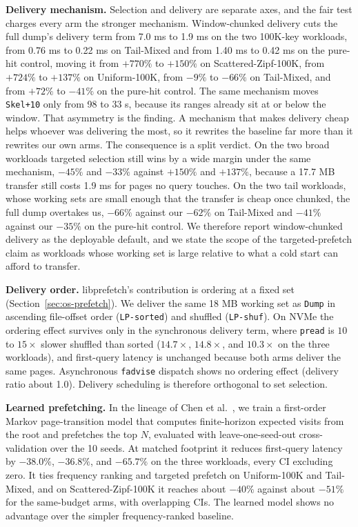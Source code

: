 \documentclass[sigconf, nonacm]{acmart}
\begin{document}
\textbf{Delivery mechanism.} Selection and delivery are separate axes, and the fair test
charges every arm the stronger mechanism. Window-chunked delivery cuts the full dump's delivery
term from 7.0 ms to 1.9 ms on the two 100K-key workloads, from 0.76 ms to 0.22 ms on Tail-Mixed
and from 1.40 ms to 0.42 ms on the pure-hit control, moving it from $+770\%$ to $+150\%$ on
Scattered-Zipf-100K, from $+724\%$ to $+137\%$ on Uniform-100K, from $-9\%$ to $-66\%$ on
Tail-Mixed, and from $+72\%$ to $-41\%$ on the pure-hit control. The same mechanism moves
\texttt{Skel+10} only from 98 to 33 \textmu s, because its ranges already sit at or below the
window. That asymmetry is the finding. A mechanism that makes delivery cheap helps whoever was
delivering the most, so it rewrites the baseline far more than it rewrites our own arms. The
consequence is a split verdict. On the two broad workloads targeted selection still wins by a
wide margin under the same mechanism, $-45\%$ and $-33\%$ against $+150\%$ and $+137\%$, because
a 17.7 MB transfer still costs 1.9 ms for pages no query touches. On the two tail workloads,
whose working sets are small enough that the transfer is cheap once chunked, the full dump
overtakes us, $-66\%$ against our $-62\%$ on Tail-Mixed and $-41\%$ against our $-35\%$ on the
pure-hit control. We therefore report window-chunked delivery as the deployable default, and we
state the scope of the targeted-prefetch claim as workloads whose working set is large relative
to what a cold start can afford to transfer.

\textbf{Delivery order.} libprefetch's contribution is ordering at a fixed set (Section~\ref{sec:os-prefetch}). We deliver the same 18 MB working set as \texttt{Dump} in ascending file-offset order (\texttt{LP-sorted}) and shuffled (\texttt{LP-shuf}). On NVMe the ordering effect survives only in the synchronous delivery term, where \texttt{pread} is $10$ to $15 \times$ slower shuffled than sorted ($14.7\times$, $14.8\times$, and $10.3\times$ on the three workloads), and first-query latency is unchanged because both arms deliver the same pages. Asynchronous \texttt{fadvise} dispatch shows no ordering effect (delivery ratio about 1.0). Delivery scheduling is therefore orthogonal to set selection.

\textbf{Learned prefetching.} In the lineage of Chen et al.~\cite{Chen2021}, we train a first-order Markov page-transition model that computes finite-horizon expected visits from the root and prefetches the top $N$, evaluated with leave-one-seed-out cross-validation over the 10 seeds. At matched footprint it reduces first-query latency by $-38.0\%$, $-36.8\%$, and $-65.7\%$ on the three workloads, every CI excluding zero. It ties frequency ranking and targeted prefetch on Uniform-100K and Tail-Mixed, and on Scattered-Zipf-100K it reaches about $-40\%$ against about $-51\%$ for the same-budget arms, with overlapping CIs. The learned model shows no advantage over the simpler frequency-ranked baseline.
\end{document}
